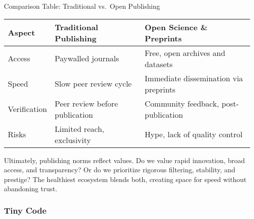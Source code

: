 \documentclass[
  letterpaper,
  DIV=11,
  numbers=noendperiod]{scrreprt}
\begin{document}
Comparison Table: Traditional vs.~Open Publishing

\begin{longtable}[]{@{}
  >{\raggedright\arraybackslash}p{}
  >{\raggedright\arraybackslash}p{}
  >{\raggedright\arraybackslash}p{}@{}}
\toprule\noalign{}
\begin{minipage}[b]{\linewidth}\raggedright
Aspect
\end{minipage} & \begin{minipage}[b]{\linewidth}\raggedright
Traditional Publishing
\end{minipage} & \begin{minipage}[b]{\linewidth}\raggedright
Open Science \& Preprints
\end{minipage} \\
\midrule\noalign{}
\endhead
\bottomrule\noalign{}
\endlastfoot
Access & Paywalled journals & Free, open archives and datasets \\
Speed & Slow peer review cycle & Immediate dissemination via
preprints \\
Verification & Peer review before publication & Community feedback,
post-publication \\
Risks & Limited reach, exclusivity & Hype, lack of quality control \\
\end{longtable}

Ultimately, publishing norms reflect values. Do we value rapid
innovation, broad access, and transparency? Or do we prioritize rigorous
filtering, stability, and prestige? The healthiest ecosystem blends
both, creating space for speed without abandoning trust.

\subsubsection{Tiny Code}\label{tiny-code-95}
\end{document}
